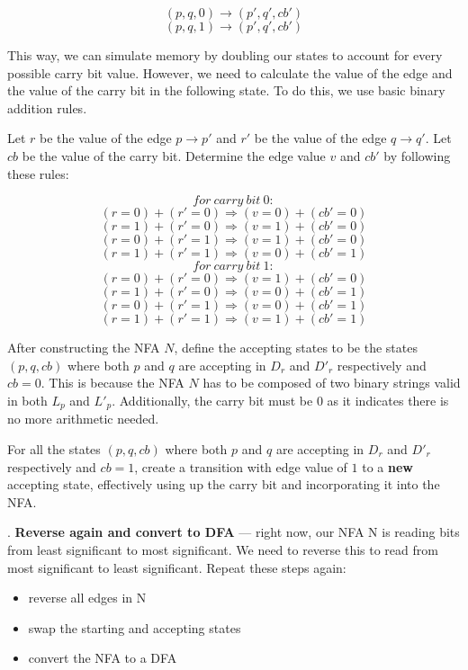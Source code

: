 \documentclass[12pt]{article}
\begin{document}
\begin{solution}
    \[
        (p, q, 0) \rightarrow (p', q', cb')
    \]
       \[
        (p, q, 1) \rightarrow (p', q', cb')
    \]

    This way, we can simulate memory by doubling our states to account for every possible carry bit value. However, we need to calculate the value of the edge and the value of the carry bit in the following state. To do this, we use basic binary addition rules. 

    Let $r$ be the value of the edge $p\rightarrow p'$ and $r'$ be the value of the edge $q\rightarrow q'$. Let $cb$ be the value of the carry bit. Determine the edge value $v$ and $cb'$ by following these rules:

    \[
    for\ carry\ bit\ 0:
    \]
    \[
    (r = 0) + (r'=0) \Rightarrow (v=0) + (cb'=0)
    \]
    \[
    (r = 1) + (r'=0) \Rightarrow (v=1) + (cb'=0)
    \]
    \[
    (r = 0) + (r'=1) \Rightarrow (v=1) + (cb'=0)
    \]
    \[
    (r = 1) + (r'=1) \Rightarrow (v=0) + (cb'=1)
    \]
    \[
    for\ carry\ bit\ 1:
    \]
    \[
    (r = 0) + (r'=0) \Rightarrow (v=1) + (cb'=0)
    \]
    \[
    (r = 1) + (r'=0) \Rightarrow (v=0) + (cb'=1)
    \]
    \[
    (r = 0) + (r'=1) \Rightarrow (v=0) + (cb'=1)
    \]
    \[
    (r = 1) + (r'=1) \Rightarrow (v=1) + (cb'=1)
    \]

After constructing the NFA $N$, define the accepting states to be the states $(p, q, cb)$ where both $p$ and $q$ are accepting in $D_r$ and $D'_r$ respectively and $cb = 0$. This is because the NFA $N$ has to be composed of two binary strings valid in both $L_p$ and $L'_p$. Additionally, the carry bit must be $0$ as it indicates there is no more arithmetic needed.

For all the states $(p, q, cb)$ where both $p$ and $q$ are accepting in $D_r$ and $D'_r$ respectively and $cb = 1$, create a transition with edge value of $1$ to a \textbf{new} accepting state, effectively using up the carry bit and incorporating it into the NFA.

. \textbf{Reverse again and convert to DFA} — right now, our NFA N is reading bits from least significant to most significant. We need to reverse this to read from most significant to least significant. Repeat these steps again:
    \begin{itemize}
        \item reverse all edges in N
        \item swap the starting and accepting states
        \item convert the NFA to a DFA
    \end{itemize}


\end{solution}
\end{document}

